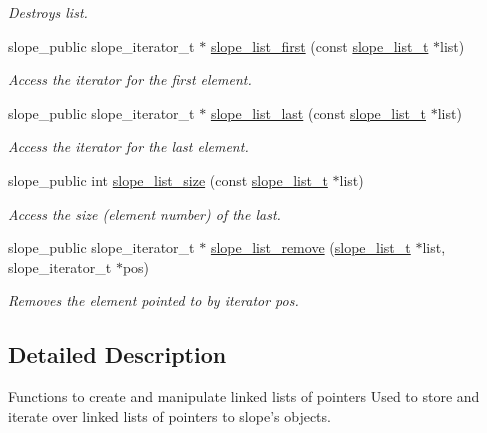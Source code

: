 \begin{DoxyCompactItemize}
\begin{DoxyCompactList}\small\item\em Destroys list. \end{DoxyCompactList}\item 
slope\+\_\+public slope\+\_\+iterator\+\_\+t $\ast$ \hyperlink{group__List_ga7fbf15803b6c95dc32989a0d9170f145}{slope\+\_\+list\+\_\+first} (const \hyperlink{struct__slope__list}{slope\+\_\+list\+\_\+t} $\ast$list)
\begin{DoxyCompactList}\small\item\em Access the iterator for the first element. \end{DoxyCompactList}\item 
slope\+\_\+public slope\+\_\+iterator\+\_\+t $\ast$ \hyperlink{group__List_ga3b742a38cf861650f7b1a15ae038fac9}{slope\+\_\+list\+\_\+last} (const \hyperlink{struct__slope__list}{slope\+\_\+list\+\_\+t} $\ast$list)
\begin{DoxyCompactList}\small\item\em Access the iterator for the last element. \end{DoxyCompactList}\item 
slope\+\_\+public int \hyperlink{group__List_gadbc1b27be93a2a166071c14ebb008359}{slope\+\_\+list\+\_\+size} (const \hyperlink{struct__slope__list}{slope\+\_\+list\+\_\+t} $\ast$list)
\begin{DoxyCompactList}\small\item\em Access the size (element number) of the last. \end{DoxyCompactList}\item 
slope\+\_\+public slope\+\_\+iterator\+\_\+t $\ast$ \hyperlink{group__List_ga0066274727609b058da0b561743dc318}{slope\+\_\+list\+\_\+remove} (\hyperlink{struct__slope__list}{slope\+\_\+list\+\_\+t} $\ast$list, slope\+\_\+iterator\+\_\+t $\ast$pos)
\begin{DoxyCompactList}\small\item\em Removes the element pointed to by iterator pos. \end{DoxyCompactList}\end{DoxyCompactItemize}


\subsection{Detailed Description}
Functions to create and manipulate linked lists of pointers Used to store and iterate over linked lists of pointers to slope's objects. 

